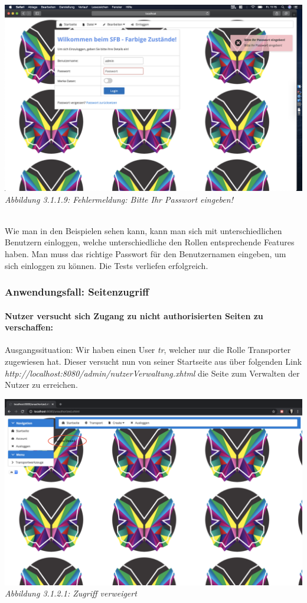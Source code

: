 \documentclass[enabledeprecatedfontcommands,fontsize=12pt,paper=a4,twoside]{scrartcl}
\begin{document}
\hypertarget{sc3.1.1.9}{
\includegraphics[width=1\textwidth]{Screenshots/311BittePasswordEingeben.png}
\textit{Abbildung 3.1.1.9: Fehlermeldung: Bitte Ihr Passwort eingeben!}
} \\

Wie man in den Beispielen sehen kann, kann man sich mit unterschiedlichen Benutzern einloggen, welche unterschiedliche den Rollen entsprechende Features haben. Man muss das richtige Passwort für den Benutzernamen eingeben, um sich einloggen zu können. Die Tests verliefen erfolgreich. \\ 


\subsubsection{Anwendungsfall: Seitenzugriff}

%
\paragraph{Nutzer versucht sich Zugang zu nicht authorisierten Seiten zu verschaffen:}

Ausgangssituation: Wir haben einen User \textit{tr}, welcher nur die Rolle Transporter zugewiesen hat. Dieser versucht nun von seiner Startseite aus über folgenden Link \textit{http://localhost:8080/admin/nutzerVerwaltung.xhtml} die Seite zum Verwalten der Nutzer zu erreichen. 

\hypertarget{sc3.1.2.1.1}{
\includegraphics[width=1\textwidth]{Screenshots/3121.png}
\textit{Abbildung 3.1.2.1: Zugriff verweigert}
} \\
\end{document}

